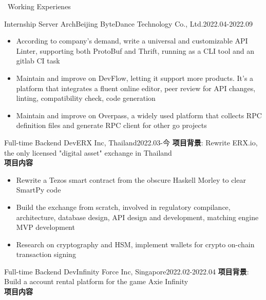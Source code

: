 \documentclass{resume}
\begin{document}
\begin{rSection}{\faUsers~Working Experienes}
    \begin{rExperience}{Internship Server Arch}{Beijing ByteDance Technology Co., Ltd.}{2022.04-2022.09}
        \begin{itemize}
            \itemsep -0.5em \vspace{-0.5em}
            \item According to company's demand, write a universal and customizable API Linter, supporting both ProtoBuf and Thrift, running as a CLI tool and an gitlab CI task
            \item Maintain and improve on DevFlow, letting it support more products. It's a platform that integrates a fluent online editor, peer review for API changes, linting, compatibility check, code generation
            \item Maintain and improve on Overpass, a widely used platform that collects RPC definition files and generate RPC client for other go projects
        \end{itemize}
    \end{rExperience}
    \begin{rExperience}{Full-time Backend Dev}{ERX Inc, Thailand}{2022.03-今}
        \textbf{项目背景}:
        Rewrite ERX.io, the only licensed "digital asset" exchange in Thailand\\
        \textbf{项目内容}
        \begin{itemize}
            \itemsep -0.5em \vspace{-0.5em}
            \item Rewrite a Tezos smart contract from the obscure Haskell Morley to clear SmartPy code
            \item Build the exchange from scratch, involved in regulatory compilance, architecture, database design, API design and development, matching engine MVP development
            \item Research on cryptography and HSM, implement wallets for crypto on-chain transaction signing
        \end{itemize}
    \end{rExperience}
    \begin{rExperience}{Full-time Backend Dev}{Infinity Force Inc, Singapore}{2022.02-2022.04}
        \textbf{项目背景}:
        Build a account rental platform for the game Axie Infinity\\
        \textbf{项目内容}
        \begin{itemize}

\end{itemize}
\end{rExperience}
\end{rSection}
\end{document}
